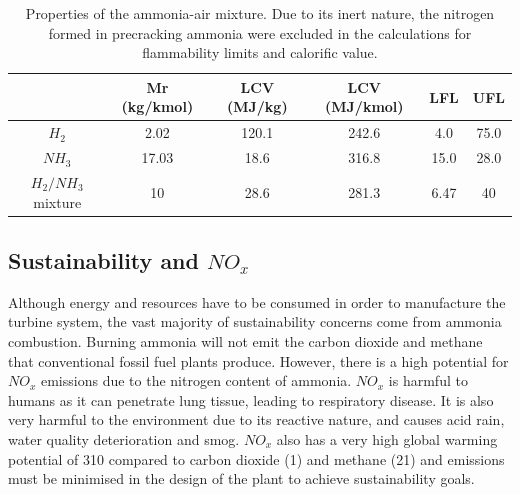 \documentclass[11pt, oneside]{article}
\begin{document}
\begin{table} [h]
\begin{center}
\caption{Properties of the ammonia-air mixture. Due to its inert nature, the nitrogen formed in precracking ammonia were excluded in the calculations for flammability limits and calorific value. \cite{FL}} \label{tab:mixproperties}
\begin{tabular}{ |c|c|c|c|c|c| }
 \hline
& Mr (kg/kmol) & LCV (MJ/kg) \cite{website:spg}& LCV (MJ/kmol) & LFL & UFL\\ 
 \hline
  $H_2$ & 2.02 & 120.1 & 242.6 & 4.0 & 75.0\\ 
 \hline
$NH_3$ & 17.03 & 18.6 & 316.8 & 15.0 & 28.0\\ 
 \hline
$H_2/NH_3$ mixture & 10 & 28.6 & 281.3 & 6.47 & 40\\
 \hline
\end{tabular}
\end{center} 
\end{table}

\subsection{Sustainability and $NO_x$} \label{ssec:NOx}
Although energy and resources have to be consumed in order to manufacture the turbine system, the vast majority of sustainability concerns come from ammonia combustion. Burning ammonia will not emit the carbon dioxide and methane that conventional fossil fuel plants produce. However,  there is a high potential for $NO_x$ emissions due to the nitrogen content of ammonia. $NO_x$ is harmful to humans as it can penetrate lung tissue, leading to respiratory disease. It is also very harmful to the environment due to its reactive nature, and causes acid rain, water quality deterioration and smog. \cite{NOxeffect} $NO_x$ also has a very high global warming potential of 310 compared to carbon dioxide (1) and methane (21) \cite{website:NOXGWP} and emissions must be minimised in the design of the plant to achieve sustainability goals.  %
\end{document}
